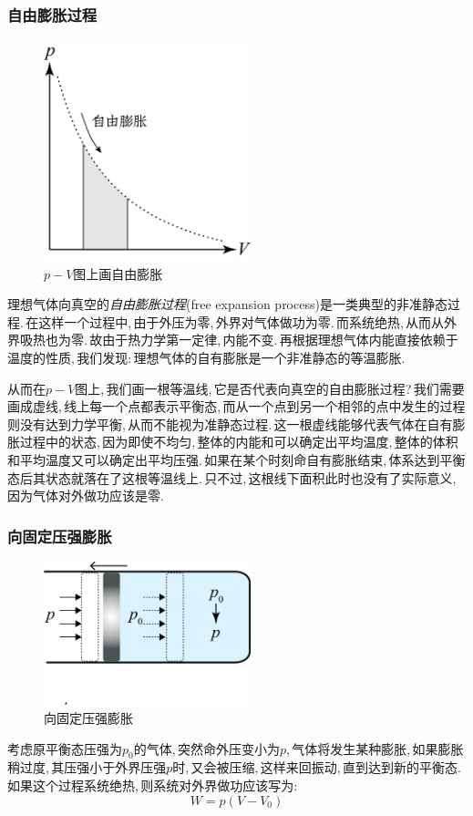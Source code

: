 \subsubsection{\hei 自由膨胀过程}
\begin{figure}
\includegraphics[width=6cm]{image/5-1-7.png}
\caption{$p-V$图上画自由膨胀}
\end{figure}
理想气体向真空的\emph{自由膨胀过程}(free expansion process)是一类典型的非准静态过程.\,在这样一个过程中,\,由于外压为零,\,外界对气体做功为零.\,而系统绝热,\,从而从外界吸热也为零.\,故由于热力学第一定律,\,内能不变.\,再根据理想气体内能直接依赖于温度的性质,\,我们发现:\,理想气体的自有膨胀是一个非准静态的等温膨胀.

从而在$p-V$图上,\,我们画一根等温线,\,它是否代表向真空的自由膨胀过程?\,我们需要画成虚线,\,线上每一个点都表示平衡态,\,而从一个点到另一个相邻的点中发生的过程则没有达到力学平衡,\,从而不能视为准静态过程.\,这一根虚线能够代表气体在自有膨胀过程中的状态,\,因为即使不均匀,\,整体的内能和可以确定出平均温度,\,整体的体积和平均温度又可以确定出平均压强.\,如果在某个时刻命自有膨胀结束,\,体系达到平衡态后其状态就落在了这根等温线上.\,只不过,\,这根线下面积此时也没有了实际意义,\,因为气体对外做功应该是零.

\vspace{2cm}

\subsubsection{\hei 向固定压强膨胀}
\begin{figure}
\includegraphics[width=6cm]{image/5-1-8.png}
\caption{向固定压强膨胀}
\end{figure}
考虑原平衡态压强为$p_0$的气体,\,突然命外压变小为$p$,\,气体将发生某种膨胀,\,如果膨胀稍过度,\,其压强小于外界压强$p$时,\,又会被压缩,\,这样来回振动,\,直到达到新的平衡态.\,如果这个过程系统绝热,\,则系统对外界做功应该写为:
\[W=p(V-V_0)\]

